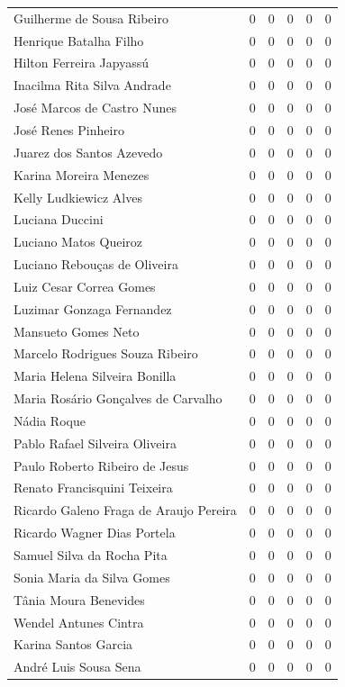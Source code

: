 \documentclass[12pt,brazil]{article}\usepackage[]{graphicx}\usepackage[]{xcolor}
\begin{document}
\begin{longtable}{lrrrrr}
Guilherme de Sousa Ribeiro & 0 & 0 & 0 & 0 & 0 \\
Henrique Batalha Filho & 0 & 0 & 0 & 0 & 0 \\
Hilton Ferreira Japyassú & 0 & 0 & 0 & 0 & 0 \\
Inacilma Rita Silva Andrade & 0 & 0 & 0 & 0 & 0 \\
José Marcos de Castro Nunes & 0 & 0 & 0 & 0 & 0 \\
José Renes Pinheiro & 0 & 0 & 0 & 0 & 0 \\
Juarez dos Santos Azevedo & 0 & 0 & 0 & 0 & 0 \\
Karina Moreira Menezes & 0 & 0 & 0 & 0 & 0 \\
Kelly Ludkiewicz Alves & 0 & 0 & 0 & 0 & 0 \\
Luciana Duccini & 0 & 0 & 0 & 0 & 0 \\
Luciano Matos Queiroz & 0 & 0 & 0 & 0 & 0 \\
Luciano Rebouças de Oliveira & 0 & 0 & 0 & 0 & 0 \\
Luiz Cesar Correa Gomes & 0 & 0 & 0 & 0 & 0 \\
Luzimar Gonzaga Fernandez & 0 & 0 & 0 & 0 & 0 \\
Mansueto Gomes Neto & 0 & 0 & 0 & 0 & 0 \\
Marcelo Rodrigues Souza Ribeiro & 0 & 0 & 0 & 0 & 0 \\
Maria Helena Silveira Bonilla & 0 & 0 & 0 & 0 & 0 \\
Maria Rosário Gonçalves de Carvalho & 0 & 0 & 0 & 0 & 0 \\
Nádia Roque & 0 & 0 & 0 & 0 & 0 \\
Pablo Rafael Silveira Oliveira & 0 & 0 & 0 & 0 & 0 \\
Paulo Roberto Ribeiro de Jesus & 0 & 0 & 0 & 0 & 0 \\
Renato Francisquini Teixeira & 0 & 0 & 0 & 0 & 0 \\
Ricardo Galeno Fraga de Araujo Pereira & 0 & 0 & 0 & 0 & 0 \\
Ricardo Wagner Dias Portela & 0 & 0 & 0 & 0 & 0 \\
Samuel Silva da Rocha Pita & 0 & 0 & 0 & 0 & 0 \\
Sonia Maria da Silva Gomes & 0 & 0 & 0 & 0 & 0 \\
Tânia Moura Benevides & 0 & 0 & 0 & 0 & 0 \\
Wendel Antunes Cintra & 0 & 0 & 0 & 0 & 0 \\
Karina Santos Garcia & 0 & 0 & 0 & 0 & 0 \\
André Luis Sousa Sena & 0 & 0 & 0 & 0 & 0 \\

\end{longtable}
\end{document}
